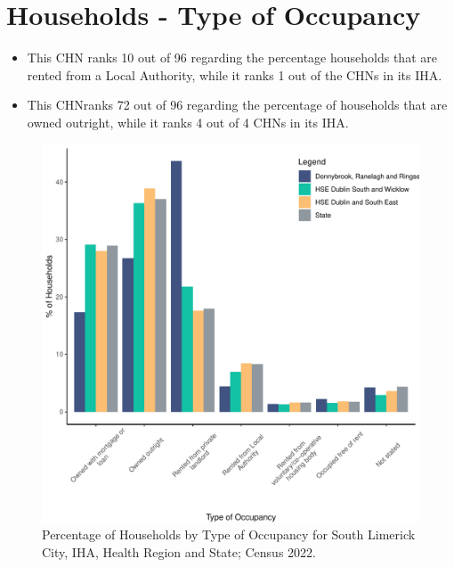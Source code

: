 \documentclass{article}
\begin{document}
\section{Households - Type of Occupancy}\label{sect:Households}
\begin{itemize}
\item This CHN ranks  10 out of 96 regarding the percentage households that are rented from a Local Authority, while it ranks  1 out of the CHNs in its IHA. 
\item This CHNranks  72 out of 96 regarding the percentage of households that are owned outright, while it ranks   4 out of 4 CHNs in its IHA.
\end{itemize}
\begin{figure}[H]
	\centering
	\includegraphics[width = 140mm]{../figures/HouseholdsED.pdf}
	\caption{Percentage of Households by Type of Occupancy for South Limerick City, IHA, Health Region and State; Census 2022.}
	\label{fig:vbnv}
	\end{figure}
\end{document}
